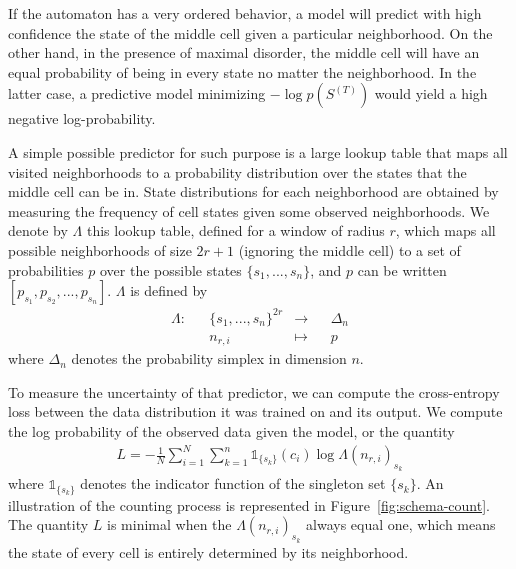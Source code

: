 If the automaton has a very ordered behavior, a model will predict with high
confidence the state of the middle cell given a particular neighborhood. On the
other hand, in the presence of maximal disorder, the middle cell will have an
equal probability of being in every state no matter the neighborhood. In the
latter case, a predictive model minimizing $-\log p(S^{(T)})$ would yield a high
negative log-probability.

A simple possible predictor for such purpose is a large lookup table that maps
all visited neighborhoods to a probability distribution over the states that the
middle cell can be in. State distributions for each neighborhood are obtained by
measuring the frequency of cell states given some observed neighborhoods. We
denote by $\Lambda$ this lookup table, defined for a window of radius $r$, which
maps all possible neighborhoods of size $2r + 1$ (ignoring the middle cell) to a
set of probabilities $p$ over the possible states $\{s_1, ..., s_n\}$, and $p$
can be written $[p_{s_1}, p_{s_2}, ... , p_{s_n}]$. $\Lambda$ is defined by
\begin{equation}
  \begin{aligned}
    \textstyle \Lambda :&& \{s_1, ..., s_n\}^{2r} &\to&& \Delta_n\\
    && n_{r,i} &\mapsto&& p
  \end{aligned}
\end{equation}
where $\Delta_n$ denotes the probability simplex in dimension $n$.

To measure the uncertainty of that predictor, we can compute the cross-entropy
loss between the data distribution it was trained on and its output. We compute
the log probability of the observed data given the model, or the quantity
\begin{align}
  \textstyle
  L = - \frac{1}{N}\sum_{i=1}^N \sum_{k=1}^n \mathds{1}_{\{ s_k \}}(c_i)
  \log\Lambda(n_{r,i})_{s_k}
  \label{eq:loss_count}
\end{align}
where $\mathds{1}_{\{s_k\}}$ denotes the indicator function of the singleton set
$\{s_k\}$. An illustration of the counting process is represented in
Figure~\ref{fig:schema-count}. The quantity $L$ is minimal when the
$\Lambda(n_{r,i})_{s_k}$ always equal one, which means the state of every cell
is entirely determined by its neighborhood.


